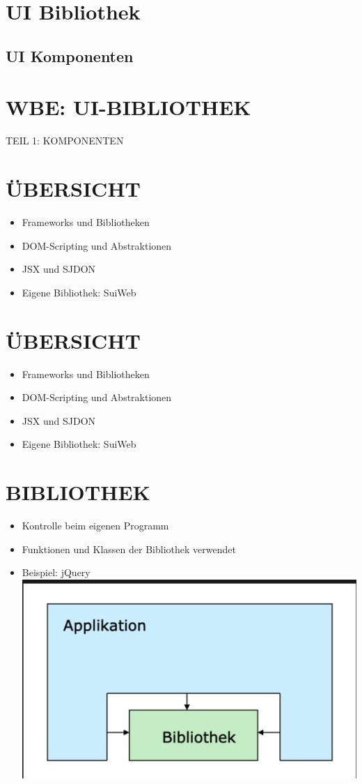 \section{UI Bibliothek}
 
\subsection{UI Komponenten}

\section*{WBE: UI-BIBLIOTHEK}
 TEIL 1: KOMPONENTEN\section*{ÜBERSICHT}
\begin{itemize}
  \item Frameworks und Bibliotheken
  \item DOM-Scripting und Abstraktionen
  \item JSX und SJDON
  \item Eigene Bibliothek: SuiWeb
\end{itemize}

\section*{ÜBERSICHT}
\begin{itemize}
  \item Frameworks und Bibliotheken
  \item DOM-Scripting und Abstraktionen
  \item JSX und SJDON
  \item Eigene Bibliothek: SuiWeb
\end{itemize}

\section*{BIBLIOTHEK}
\begin{itemize}
  \item Kontrolle beim eigenen Programm
  \item Funktionen und Klassen der Bibliothek verwendet
  \item Beispiel: jQuery\\
\includegraphics[width=\linewidth]{images/2025_01_02_22162ee5453ad0230328g-04}
\end{itemize}

